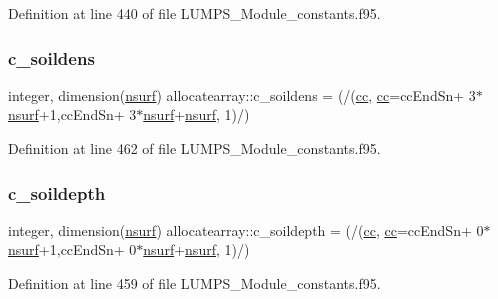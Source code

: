 Definition at line 440 of file L\+U\+M\+P\+S\+\_\+\+Module\+\_\+constants.\+f95.

\mbox{\label{namespaceallocatearray_a2a4db756af0dc3a2e28d82b831ee94bd}} 
\subsubsection{\texorpdfstring{c\+\_\+soildens}{c\_soildens}}
{\footnotesize\ttfamily integer, dimension(\hyperlink{namespaceallocatearray_acd22f92a06f7e9a2a91426b3dc99fdb0}{nsurf}) allocatearray\+::c\+\_\+soildens = (/(\hyperlink{namespaceallocatearray_ac863c81704eb507dee10f5e10741e10c}{cc}, \hyperlink{namespaceallocatearray_ac863c81704eb507dee10f5e10741e10c}{cc}=cc\+End\+Sn+ 3$\ast$\hyperlink{namespaceallocatearray_acd22f92a06f7e9a2a91426b3dc99fdb0}{nsurf}+1,cc\+End\+Sn+ 3$\ast$\hyperlink{namespaceallocatearray_acd22f92a06f7e9a2a91426b3dc99fdb0}{nsurf}+\hyperlink{namespaceallocatearray_acd22f92a06f7e9a2a91426b3dc99fdb0}{nsurf}, 1)/)}



Definition at line 462 of file L\+U\+M\+P\+S\+\_\+\+Module\+\_\+constants.\+f95.

\mbox{\label{namespaceallocatearray_a2cc3fd64e8be89aafe99172acbb85c29}} 
\subsubsection{\texorpdfstring{c\+\_\+soildepth}{c\_soildepth}}
{\footnotesize\ttfamily integer, dimension(\hyperlink{namespaceallocatearray_acd22f92a06f7e9a2a91426b3dc99fdb0}{nsurf}) allocatearray\+::c\+\_\+soildepth = (/(\hyperlink{namespaceallocatearray_ac863c81704eb507dee10f5e10741e10c}{cc}, \hyperlink{namespaceallocatearray_ac863c81704eb507dee10f5e10741e10c}{cc}=cc\+End\+Sn+ 0$\ast$\hyperlink{namespaceallocatearray_acd22f92a06f7e9a2a91426b3dc99fdb0}{nsurf}+1,cc\+End\+Sn+ 0$\ast$\hyperlink{namespaceallocatearray_acd22f92a06f7e9a2a91426b3dc99fdb0}{nsurf}+\hyperlink{namespaceallocatearray_acd22f92a06f7e9a2a91426b3dc99fdb0}{nsurf}, 1)/)}



Definition at line 459 of file L\+U\+M\+P\+S\+\_\+\+Module\+\_\+constants.\+f95.

